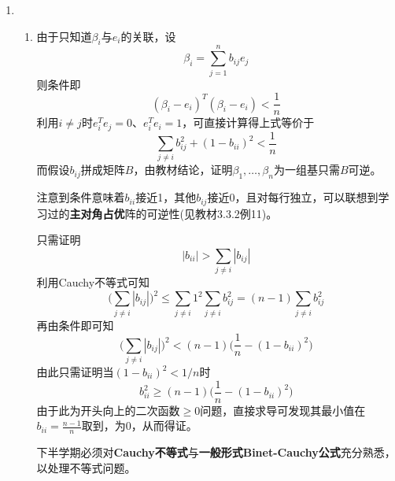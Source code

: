 \documentclass[a4paper,UTF8,fontset=windows]{ctexart}
\newcommand*{\note}{\noindent *}
\begin{document}
\begin{enumerate}
    \item
    \begin{enumerate}
        \item 
        由于只知道$\beta_i$与$e_i$的关联，设
        $$\beta_i=\sum_{j=1}^nb_{ij}e_j$$
        则条件即
        $$(\beta_i-e_i)^T(\beta_i-e_i)<\frac{1}{n}$$
        利用$i\ne j$时$e_i^Te_j=0$、$e_i^Te_i=1$，可直接计算得上式等价于
        $$\sum_{j\ne i}b_{ij}^2+(1-b_{ii})^2<\frac{1}{n}$$
        而假设$b_{ij}$拼成矩阵$B$，由教材结论，证明$\beta_1,\dots,\beta_n$为一组基只需$B$可逆。

        \note 注意到条件意味着$b_{ii}$接近1，其他$b_{ij}$接近0，且对每行独立，可以联想到学习过的\textbf{主对角占优}阵的可逆性(见教材3.3.2例11)。

        只需证明
        $$|b_{ii}|>\sum_{j\ne i}|b_{ij}|$$
        利用Cauchy不等式可知
        $$\bigg(\sum_{j\ne i}|b_{ij}|\bigg)^2\le\sum_{j\ne i}1^2\sum_{j\ne i}b_{ij}^2=(n-1)\sum_{j\ne i}b_{ij}^2$$
        再由条件即可知
        $$\bigg(\sum_{j\ne i}|b_{ij}|\bigg)^2<(n-1)\bigg(\frac{1}{n}-(1-b_{ii})^2\bigg)$$
        由此只需证明当$(1-b_{ii})^2<1/n$时
        $$b_{ii}^2\ge(n-1)\bigg(\frac{1}{n}-(1-b_{ii})^2\bigg)$$
        由于此为开头向上的二次函数$\ge0$问题，直接求导可发现其最小值在$b_{ii}=\frac{n-1}{n}$取到，为0，从而得证。

        \note 下半学期必须对\textbf{Cauchy不等式}与\textbf{一般形式Binet-Cauchy公式}充分熟悉，以处理不等式问题。
        

\end{enumerate}
\end{enumerate}
\end{document}
